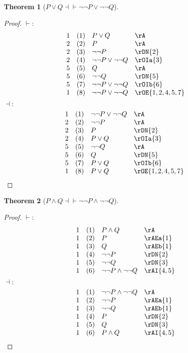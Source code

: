 \documentclass{book}
\theoremstyle{plain}
\newtheorem{theorem}{Theorem}
\theoremstyle{remark}
\theoremstyle{definition}
\begin{document}
\label{POrQEqvnnPOrnnQ}
\begin{theorem}[\(P\lor Q \dashv\vdash \neg\neg P\lor \neg\neg Q\)]
\end{theorem}
\begin{proof}
	\(\vdash:\)
	\[
	\begin{array}{llll}
		1 & (1) & P\lor Q & \rA \\
		2 & (2) & P & \rA \\
		2 & (3) & \neg\neg P & \rDN{2} \\
		2 & (4) & \neg\neg P\lor \neg\neg Q & \rOIa{3} \\
		5 & (5) &  Q & \rA \\
        5 & (6) & \neg\neg Q & \rDN{5} \\
	    5 & (7) & \neg\neg P\lor \neg\neg Q & \rOIb{6} \\
        1 & (8) & \neg\neg P\lor \neg\neg Q & \rOE{1,2,4,5,7} \\
    \end{array}
	\]
	\(\dashv:\)
	\[
	\begin{array}{llll}
		1 & (1) & \neg\neg P\lor \neg\neg Q & \rA \\
		2 & (2) & \neg\neg P & \rA \\
		2 & (3) & P & \rDN{2} \\
		2 & (4) & P\lor Q & \rOIa{3} \\
		5 & (5) & \neg\neg Q & \rA \\
        5 & (6) & Q & \rDN{5} \\
	    5 & (7) & P\lor Q & \rOIb{6} \\
        1 & (8) &  P\lor Q & \rOE{1,2,4,5,7} \	
    \end{array}
	\]
\end{proof}


\label{PAndQEqvnnPAndnnQ}
\begin{theorem}[\(P\land Q \dashv\vdash \neg\neg P\land \neg\neg Q\)]
\end{theorem}
\begin{proof}
	\(\vdash:\)
	\[
	\begin{array}{llll}
		1 & (1) & P\land Q & \rA \\
		1 & (2) & P & \rAEa{1}  \\
  		1 & (3) & Q & \rAEb{1}  \\
		1 & (4) & \neg\neg P & \rDN{2}  \\
		1 & (5) & \neg\neg Q & \rDN{3}  \\
		1 & (6) & \neg\neg P\land \neg\neg Q & \rAI{4,5}  \\
    \end{array}
	\]
	\(\dashv:\)
	\[
	\begin{array}{llll}
		1 & (1) & \neg\neg P\land \neg\neg Q & \rA \\
		1 & (2) & \neg\neg P & \rAEa{1}  \\
  		1 & (3) & \neg\neg Q & \rAEb{1}  \\
		1 & (4) & P & \rDN{2}  \\
		1 & (5) & Q & \rDN{3}  \\
		1 & (6) & P\land Q & \rAI{4,5}  \\
    \end{array}
	\]
\end{proof}
\end{document}
